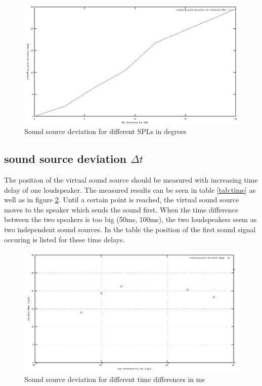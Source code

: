 \documentclass{article}
\begin{document}
\begin{figure}[htbp]
\begin{center}
\includegraphics[width=15cm,keepaspectratio=true]{SPL}
\caption{Sound source deviation for different SPLs in degrees}
\label{fig:SPL}
\end{center}
\end{figure}

\subsection{sound source deviation $\Delta t$}
The position of the virtual sound source should be measured with increasing time delay of one loudspeaker. The measured results can be seen in table \ref{tab:time} as well as in figure \ref{fig:timedelay}. Until a certain point is reached, the virtual sound source moves to the speaker which sends the sound first. When the time difference between the two speakers is too big (50ms, 100ms), the two loudspeakers seem as two independent sound sources. In the table the position of the first sound signal occuring is listed for these time delays. 
\begin{figure}[htbp]
\begin{center}
\includegraphics[width=15cm,keepaspectratio=true]{timedifference}
\caption{Sound source deviation for different time differences in ms}
\label{fig:timedelay}
\end{center}
\end{figure}
\end{document}

